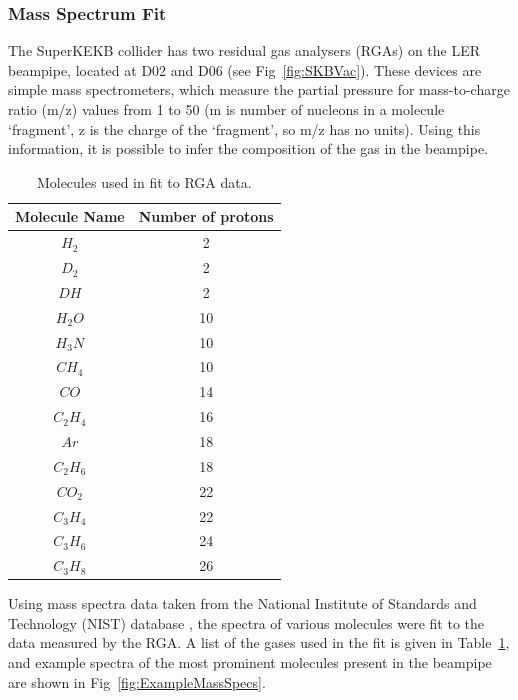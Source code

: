 \subsubsection{Mass Spectrum Fit}

	The SuperKEKB collider has two residual gas analysers (RGAs) on the LER beampipe, located at D02 and D06 (see Fig~\ref{fig:SKBVac}). These devices are simple mass spectrometers, which measure the partial pressure for mass-to-charge ratio (m/z) values from 1 to 50 (m is number of nucleons in a molecule `fragment', z is the charge of the `fragment', so m/z has no units). Using this information, it is possible to infer the composition of the gas in the beampipe. 


\begin{table}
	\centering
	\begin{tabular}{ cc }
		Molecule Name	& Number of protons	\\	\hline \hline
		$H_2$		& 2		\\	
		$D_2$		& 2		\\	
		$DH$		& 2		\\	
		$H_{2}O$	& 10		\\	
		$H_{3}N$	& 10		\\	
		$CH_4$		& 10		\\	
		$CO$		& 14		\\	
		$C_{2}H_4$	& 16		\\	
		$Ar$		& 18		\\	
		$C_{2}H_6$	& 18		\\	
		$CO_2$		& 22		\\	
		$C_{3}H_4$	& 22		\\	
		$C_{3}H_6$	& 24		\\	
		$C_{3}H_8$	& 26		\\ \hline
	\end{tabular}
	\caption[Molecules used in fit to RGA data]{Molecules used in fit to RGA data.}
	\label{tab:Molecules}
\end{table}


	Using mass spectra data taken from the National Institute of Standards and Technology (NIST) database \cite{nistMassSpec}, the spectra of various molecules were fit to the data measured by the RGA. A list of the gases used in the fit is given in Table~\ref{tab:Molecules}, and example spectra of the most prominent molecules present in the beampipe are shown in Fig~\ref{fig:ExampleMassSpecs}. 

